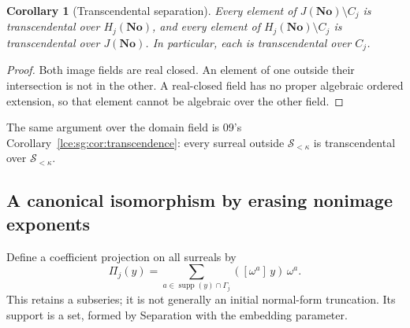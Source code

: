 \documentclass[11pt,letterpaper]{article}
\numberwithin{equation}{section}
\newtheorem{corollary}[theorem]{Corollary}
\theoremstyle{definition}
\theoremstyle{remark}
\newcommand{\No}{\mathbf{No}}
\newcommand{\supp}{\operatorname{supp}}
\newcommand{\Sk}{\mathscr S_{<\kappa}}
\newcommand{\Gam}{\Gamma_j}
\newcommand{\Common}{C_j}
\newcommand{\coef}[2]{[\omega^{#1}]\,#2}
\begin{document}
\begin{corollary}[Transcendental separation]\label{lce:cor:transcendence}
Every element of $J(\No)\setminus\Common$ is transcendental over
$H_j(\No)$, and every element of $H_j(\No)\setminus\Common$ is
transcendental over $J(\No)$. In particular, each is transcendental over
$\Common$.
\end{corollary}
\begin{proof}
Both image fields are real closed. An element of one outside their
intersection is not in the other. A real-closed field has no proper
algebraic ordered extension, so that element cannot be algebraic over
the other field.
\end{proof}
The same argument over the domain field is 09's
Corollary~\ref{lce:sg:cor:transcendence}: every surreal outside $\Sk$ is
transcendental over $\Sk$.

\subsection{A canonical isomorphism by erasing nonimage exponents}
Define a coefficient projection on all surreals by
\begin{equation}\label{lce:eq:projection}
 \Pi_j(y)=\sum_{a\in\supp(y)\cap\Gam}
                  (\coef{a}{y})\,\omega^a.
\end{equation}
This retains a subseries; it is not generally an initial normal-form
truncation. Its support is a set, formed by Separation with the embedding
parameter.
\end{document}
